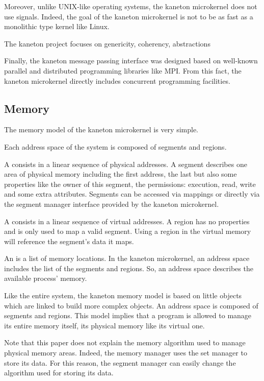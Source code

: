 \begin{multicols}{2}
Moreover, unlike UNIX-like operating systems, the kaneton microkernel does
not use signals. Indeed, the goal of the kaneton microkernel is not to
be as fast as a monolithic type kernel like Linux.

The kaneton project focuses on genericity, coherency, abstractions \etc{}

Finally, the kaneton message passing interface was designed based on
well-known parallel and distributed programming libraries like MPI. From
this fact, the kaneton microkernel directly includes concurrent
programming facilities.

%
%

\subsection{Memory}

The memory model of the kaneton microkernel is very simple.

Each address space of the system is composed of segments and regions.

A  consists in a linear sequence of physical addresses.
A segment describes one area of physical memory including the
first address, the last but also some properties like the owner of this
segment, the permissions: execution, read, write \etc{} and some
extra attributes. Segments can be accessed via mappings or directly via
the segment manager interface provided by the kaneton microkernel.

A  consists in a linear sequence of virtual addresses.
A region has no properties and is only used to map a valid segment.
Using a region in the virtual memory will reference the segment's data
it maps.

An  is a list of memory locations. In the kaneton
microkernel, an address space includes the list of the segments and regions.
So, an address space describes the available process' memory.

Like the entire system, the kaneton memory model is based on little objects
which are linked to build more complex objects. An address space is composed
of segments and regions. This model implies that a program is allowed to
manage its entire memory itself, its physical memory like its virtual one.

Note that this paper does not explain the memory algorithm used to manage
physical memory areas. Indeed, the memory manager uses the set manager
to store its data. For this reason, the segment manager can easily change
the algorithm used for storing its data.


\end{multicols}
